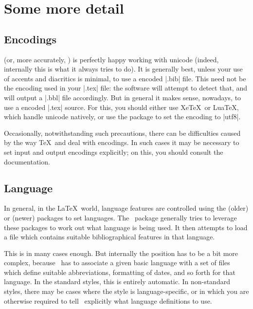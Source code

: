 \section{Some more detail}

\subsection{Encodings}

 (or, more accurately, ) is perfectly
happy working with unicode (indeed, internally this is what it always
tries to do). It is generally best, unless your use of accents and
diacritics is minimal, to use a  encoded |.bib|
file. This need not be the encoding used in your |.tex| file: the
software will attempt to detect that, and will output a |.bbl| file
accordingly. But in general it makes sense, nowadays, to use a
 encoded |.tex| source. For this, you should either
use Xe\TeX\ or Lua\TeX, which handle unicode natively, or use the
 package to set the encoding to |utf8|.

Occasionally, notwithstanding such precautions, there can be
difficulties caused by the way \TeX\ and  deal with
encodings. In such cases it may be necessary to set input and output
encodings explicitly; on this, you should consult the 
documentation.

\subsection{Language}

In general, in the \LaTeX\ world, language features are controlled
using the (older)  or (newer) 
packages to set languages. The \biblatex\ package generally tries to
leverage these packages to work out what language is being used. It
then attempts to load a file which contains suitable bibliographical
features in that language.

This is in many cases enough. But internally the position has to be a
bit more complex, because \biblatex\ has to associate a given basic
language with a set of files which define suitable abbreviations,
formatting of dates, and so forth for that language. In the standard
styles, this is entirely automatic. In non-standard styles, there may
be cases where the style is language-specific, or in which you are
otherwise required to tell \biblatex\ explicitly what language
definitions to use.

